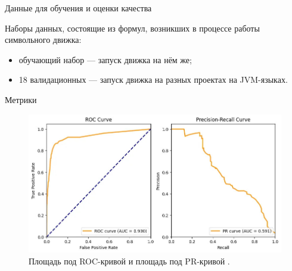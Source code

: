 \documentclass[14pt,aspectratio=169,hyperref={pdftex,unicode},xcolor=dvipsnames]{beamer}
\begin{document}
\begin{frame}{Данные для обучения и оценки качества}
\begin{minipage}{0.5\textwidth}
\end{minipage}%
\begin{minipage}{0.5\textwidth}

Наборы данных, состоящие из формул, возникших в процессе работы символьного движка:

\begin{itemize}
  \item обучающий набор --- запуск движка на нём же;
  \item 18 валидационных --- запуск движка на разных проектах на JVM-языках.
\end{itemize}

\end{minipage}

\end{frame}



\begin{frame}{Метрики}

\begin{figure}[ht]
\begin{center}
  \includegraphics[scale=0.35]{./assets/roc-auc-vs-au-prc.jpg}
  \caption{\label{roc-auc-and-avg-prc} Площадь под ROC-кривой и площадь под PR-кривой \cite{roc-auc-and-avg-prc}.}
\end{center}
\end{figure}


\end{frame}
\end{document}

